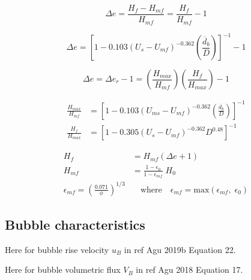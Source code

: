 \documentclass[12pt,titlepage]{article}
\begin{document}
\begin{equation} \label{eq:delta-e}
    \Delta e = \frac{H_f - H_{mf}}{H_{mf}} = \frac{H_f}{H_{mf}} - 1
\end{equation}

\begin{equation} \label{eq:delta-e-bub}
    \Delta e = \left[ 1 - 0.103 (U_s - U_{mf})^{-0.362} \left( \frac{\overline{d}_b}{D} \right) \right]^{-1} - 1
\end{equation}

\begin{equation} \label{eq:delta-er}
    \Delta e = \Delta e_r - 1 = \left(\frac{H_{max}}{H_{mf}}\right) \left(\frac{H_f}{H_{max}}\right) - 1
\end{equation}

\begin{align}
    \frac{H_{max}}{H_{mf}} &= \left[1 - 0.103 (U_{ms} - U_{mf})^{-0.362} \left( \frac{\overline{d}_b}{D} \right) \right]^{-1} \label{eq:h-ratio-1} \\
    \frac{H_{f}}{H_{max}} &= \left[1 - 0.305 (U_s - U_{mf})^{-0.362} D^{0.48} \right]^{-1} \label{eq:h-ratio-2}
\end{align}

\begin{align}
    H_f &= H_{mf} (\Delta e + 1) \label{eq:Hf} \\
    H_{mf} &= \frac{1 - \epsilon_0}{1 - \epsilon_{mf}} \; H_0 \label{eq:Hmf} \\
    \epsilon_{mf} = \left(\frac{0.071}{\phi}\right)^{1/3} &\quad \text{where} \quad \epsilon_{mf} = \text{max}(\epsilon_{mf},\; \epsilon_0) \label{eq:emf}
\end{align}

\subsection{Bubble characteristics}

Here for bubble rise velocity $u_B$ in ref Agu 2019b Equation 22.

Here for bubble volumetric flux $V_B$ in ref Agu 2018 Equation 17.


\printnomenclature


\printbibliography
\end{document}
